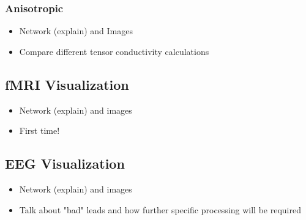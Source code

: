 \subsubsection{Anisotropic}

\begin{itemize}

\item Network (explain) and Images

\item Compare different tensor conductivity calculations

\end{itemize}

\subsection{fMRI Visualization}

\begin{itemize}

\item Network (explain) and images

\item First time!

\end{itemize}

\subsection{EEG Visualization}

\begin{itemize}

\item Network (explain) and images

\item Talk about "bad" leads and how further specific processing will be required

\end{itemize}




